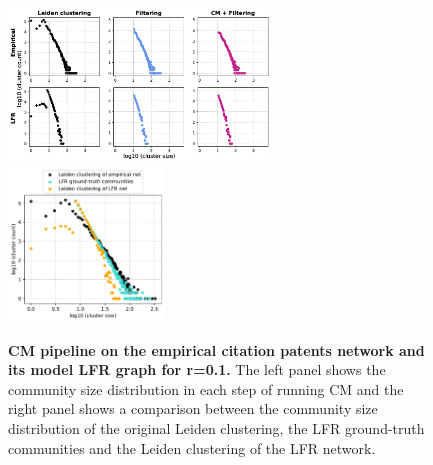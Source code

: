 \documentclass[a4paper]{article}   	%
\begin{document}
\begin{figure}[h!]
\centering
\includegraphics[width=0.62\textwidth]{figs/cit_patents_cm_steps_lfr1.pdf}
\includegraphics[width=0.37\textwidth]{figs/cit_patents_1_cm_size.pdf}
\caption[CM pipeline on the empirical citation patents network and its model LFR graph for r=0.1]{\textbf{CM pipeline on the empirical citation patents network and its model LFR graph for r=0.1.} The left panel shows the community size distribution in each step of running CM and the right panel shows a comparison between the community size distribution of the original Leiden clustering, the LFR ground-truth communities and the Leiden clustering of the LFR network.}
\label{fig:patents-cm-lfr-1}
\end{figure}
\end{document}
